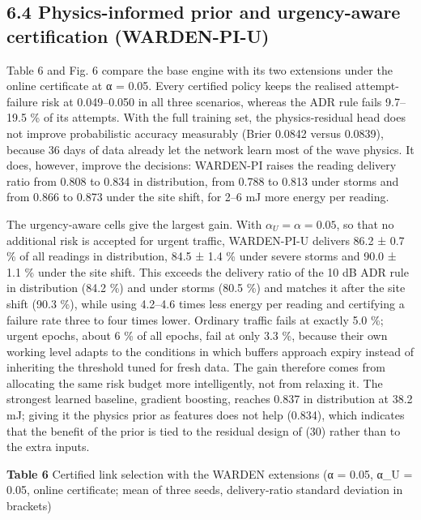 \documentclass[
  11pt,
]{article}
\begin{document}
\hypertarget{physics-informed-prior-and-urgency-aware-certification-warden-pi-u}{%
\subsection{6.4 Physics-informed prior and urgency-aware certification
(WARDEN-PI-U)}\label{physics-informed-prior-and-urgency-aware-certification-warden-pi-u}}

Table 6 and Fig. 6 compare the base engine with its two extensions under
the online certificate at α = 0.05. Every certified policy keeps the
realised attempt-failure risk at 0.049--0.050 in all three scenarios,
whereas the ADR rule fails 9.7--19.5 \% of its attempts. With the full
training set, the physics-residual head does not improve probabilistic
accuracy measurably (Brier 0.0842 versus 0.0839), because 36 days of
data already let the network learn most of the wave physics. It does,
however, improve the decisions: WARDEN-PI raises the reading delivery
ratio from 0.808 to 0.834 in distribution, from 0.788 to 0.813 under
storms and from 0.866 to 0.873 under the site shift, for 2--6 mJ more
energy per reading.

The urgency-aware cells give the largest gain. With
\(\alpha_U=\alpha=0.05\), so that no additional risk is accepted for
urgent traffic, WARDEN-PI-U delivers 86.2 ± 0.7 \% of all readings in
distribution, 84.5 ± 1.4 \% under severe storms and 90.0 ± 1.1 \% under
the site shift. This exceeds the delivery ratio of the 10 dB ADR rule in
distribution (84.2 \%) and under storms (80.5 \%) and matches it after
the site shift (90.3 \%), while using 4.2--4.6 times less energy per
reading and certifying a failure rate three to four times lower.
Ordinary traffic fails at exactly 5.0 \%; urgent epochs, about 6 \% of
all epochs, fail at only 3.3 \%, because their own working level adapts
to the conditions in which buffers approach expiry instead of inheriting
the threshold tuned for fresh data. The gain therefore comes from
allocating the same risk budget more intelligently, not from relaxing
it. The strongest learned baseline, gradient boosting, reaches 0.837 in
distribution at 38.2 mJ; giving it the physics prior as features does
not help (0.834), which indicates that the benefit of the prior is tied
to the residual design of (30) rather than to the extra inputs.


\textbf{Table 6} Certified link selection with the WARDEN extensions (α
= 0.05, α\_U = 0.05, online certificate; mean of three seeds,
delivery-ratio standard deviation in brackets)
\end{document}
